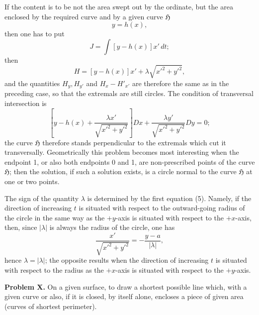 \documentclass[11pt,a4paper,leqno]{article}
\begin{document}
If the content is to be not the area swept out by the ordinate, but the area enclosed by the required curve and by a given curve $\mathfrak{H}$
\[
y=h(x),
\]
then one has to put
\[
J=\int [y-h(x)]x'\,dt;
\]
then
\[
H=[y-h(x)]x'+\lambda\sqrt{x'^2+y'^2},
\]
and the quantities $H_y,H_{y'}$ and $H_x-H'_{x'}$ are therefore the same as in the preceding case, so that the extremals are still circles. The condition of transversal intersection is
\[
\left[y-h(x)+\frac{\lambda x'}{\sqrt{x'^2+y'^2}}\right]Dx+
\frac{\lambda y'}{\sqrt{x'^2+y'^2}}Dy=0;
\]
the curve $\mathfrak{H}$ therefore stands perpendicular to the extremals which cut it transversally. Geometrically this problem becomes most interesting when the endpoint 1, or also both endpoints 0 and 1, are non-prescribed points of the curve $\mathfrak{H}$; then
the solution, if such a solution exists, is a circle normal to the curve $\mathfrak{H}$ at one or two points.

The sign of the quantity $\lambda$ is determined by the first equation (5). Namely, if the direction of increasing $t$ is situated with respect to the outward-going radius of the circle in the same way as the $+y$-axis is situated with respect to the $+x$-axis, then, since $|\lambda|$ is always the radius of the circle, one has
\[
\frac{x'}{\sqrt{x'^2+y'^2}}=-\frac{y-a}{|\lambda|},
\]
hence $\lambda=|\lambda|$; the opposite results when the direction of increasing $t$ is situated with respect to the radius as the $+x$-axis is situated with respect to the $+y$-axis.

\medskip
\noindent\textbf{Problem X.} On a given surface, to draw a shortest possible line which, with a given curve or also, if it is closed, by itself alone, encloses a piece of given area (curves of shortest perimeter).
\end{document}
